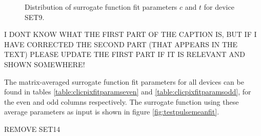 \begin{figure}
\centering
{}
\label{fig:fitparams2d}
\caption[Distribution as a function of matrix position of surrogate function fit parameter $c$ for Set 9.]{Distribution of surrogate function fit parameters $c$ and $t$ for device SET9.}
\end{figure}

I DONT KNOW WHAT THE FIRST PART OF THE CAPTION IS, BUT IF I HAVE CORRECTED THE SECOND PART (THAT APPEARS IN THE TEXT) PLEASE UPDATE THE FIRST PART IF IT IS RELEVANT AND SHOWN SOMEWHERE!

The matrix-averaged surrogate function fit parameters for all devices can be found in tables \ref{table:clicpixfitparamseven} and  \ref{table:clicpixfitparamsodd}, for the even and odd columns respectively.  The surrogate function using these average parameters as input is shown in figure \ref{fig:testpulsemeanfit}.

REMOVE SET14

